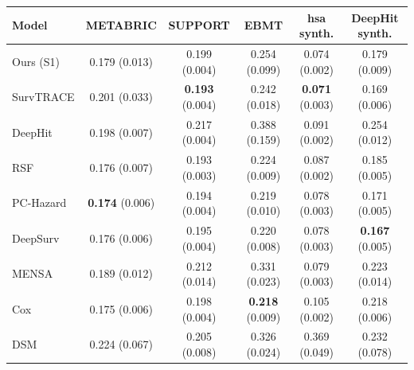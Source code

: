 \begin{tabular}{lccccc}
\toprule
Model & METABRIC & SUPPORT & EBMT & hsa synth. & DeepHit synth. \\
\midrule
Ours (S1) & 0.179 (0.013) & 0.199 (0.004) & 0.254 (0.099) & 0.074 (0.002) & 0.179 (0.009) \\
SurvTRACE & 0.201 (0.033) & \textbf{0.193} (0.004) & 0.242 (0.018) & \textbf{0.071} (0.003) & 0.169 (0.006) \\
DeepHit & 0.198 (0.007) & 0.217 (0.004) & 0.388 (0.159) & 0.091 (0.002) & 0.254 (0.012) \\
RSF & 0.176 (0.007) & 0.193 (0.003) & 0.224 (0.009) & 0.087 (0.002) & 0.185 (0.005) \\
PC-Hazard & \textbf{0.174} (0.006) & 0.194 (0.004) & 0.219 (0.010) & 0.078 (0.003) & 0.171 (0.005) \\
DeepSurv & 0.176 (0.006) & 0.195 (0.004) & 0.220 (0.008) & 0.078 (0.003) & \textbf{0.167} (0.005) \\
MENSA & 0.189 (0.012) & 0.212 (0.014) & 0.331 (0.023) & 0.079 (0.003) & 0.223 (0.014) \\
Cox & 0.175 (0.006) & 0.198 (0.004) & \textbf{0.218} (0.009) & 0.105 (0.002) & 0.218 (0.006) \\
DSM & 0.224 (0.067) & 0.205 (0.008) & 0.326 (0.024) & 0.369 (0.049) & 0.232 (0.078) \\
\bottomrule
\end{tabular}
